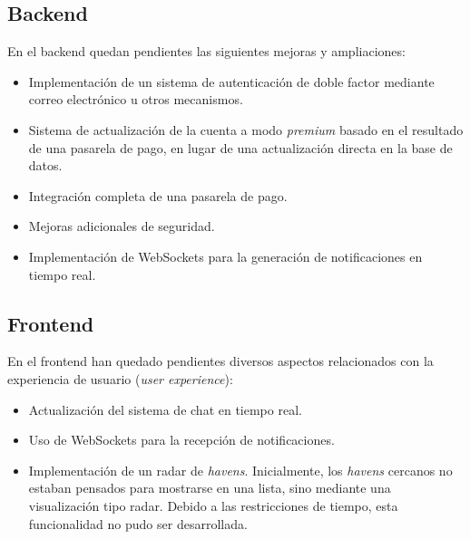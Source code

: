 \subsection{Backend}

En el backend quedan pendientes las siguientes mejoras y ampliaciones:

\begin{itemize}
    \item Implementación de un sistema de autenticación de doble factor mediante correo electrónico u otros mecanismos.
    \item Sistema de actualización de la cuenta a modo \textit{premium} basado en el resultado de una pasarela de pago, en lugar de una actualización directa en la base de datos.
    \item Integración completa de una pasarela de pago.
    \item Mejoras adicionales de seguridad.
    \item Implementación de WebSockets para la generación de notificaciones en tiempo real.
\end{itemize}

\subsection{Frontend}

En el frontend han quedado pendientes diversos aspectos relacionados con la experiencia de usuario (\textit{user experience}):

\begin{itemize}
    \item Actualización del sistema de chat en tiempo real.
    \item Uso de WebSockets para la recepción de notificaciones.
    \item Implementación de un radar de \textit{havens}. Inicialmente, los \textit{havens} cercanos no estaban pensados para mostrarse en una lista, sino mediante una visualización tipo radar. Debido a las restricciones de tiempo, esta funcionalidad no pudo ser desarrollada.
\end{itemize}


